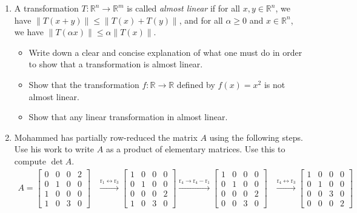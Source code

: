 \documentclass[red]{tutorial}
\newcommand{\R}{\mathbb{R}}
\theoremstyle{definition}
\theoremstyle{theorem}
\begin{document}
\begin{tutorial}
\begin{enumerate}
{\begin{enumerate}
      \end{enumerate}
      }
    \item %
      A transformation $T:\R^n\to \R^m$ is called 
      \textit{almost linear} if for all $x,y\in \R^n$, we have 
      $\|T(x+y)\| \le \|T(x)+T(y)\|$, and for all 
      $\alpha\ge 0$ and $x\in \R^n$, we have 
      $\|T(\alpha x)\|\le \alpha \|T(x)\|$.
      \begin{itemize}
        \item Write down a clear and concise explanation of what 
          one must do in order to show that a transformation is 
          almost linear.
        \item Show that the transformation $f:\R\to\R$ defined 
          by $f(x) = x^2$ is not almost linear.
        \item Show that any linear transformation in almost linear.
      \end{itemize}
    \item
      \newcommand{\pmin}{\phantom{-}}
      \newcommand{\row}[1]{\mathrm{r}_{#1}}
      Mohammed has partially row-reduced the matrix $A$ using the
      following steps. Use his work to write $A$ as a product of elementary
      matrices. Use this to compute $\det A$.
      \begin{align*}
        A = \begin{bmatrix}
          0 & 0 & 0 & 2 \\
          0 & 1 & 0 & 0 \\
          1 & 0 & 0 & 0 \\
          1 & 0 & 3 & 0
        \end{bmatrix}&\xrightarrow{\row{1} \leftrightarrow \row{3}}
        \begin{bmatrix}
          1 & 0 & 0 & 0 \\
          0 & 1 & 0 & 0 \\
          0 & 0 & 0 & 2 \\
          1 & 0 & 3 & 0
        \end{bmatrix}
        \xrightarrow{\row{4} \to \row{4}-\row{1}}
        \begin{bmatrix}
          1 & 0 & 0 & 0 \\
          0 & 1 & 0 & 0 \\
          0 & 0 & 0 & 2 \\
          0 & 0 & 3 & 0
        \end{bmatrix}
        &\xrightarrow{\row{4} \leftrightarrow \row{3}}
        \begin{bmatrix}
          1 & 0 & 0 & 0 \\
          0 & 1 & 0 & 0 \\
          0 & 0 & 3 & 0 \\
          0 & 0 & 0 & 2
        \end{bmatrix}&&
      \end{align*}


\end{enumerate}
\end{tutorial}
\end{document}
